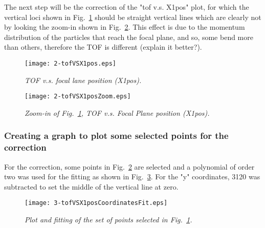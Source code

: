 \documentclass[11pt]{report}
\begin{document}
\noindent
The next step will be the correction of the "tof v.s. X1pos" plot, for which 
the vertical loci shown in Fig.~\ref{fig:tofVSX1pos} should be straight vertical lines 
which are clearly not by looking the zoom-in shown in Fig.~\ref{fig:tofVSX1posZoom}. 
This effect is due to the  momentum distribution of the particles that reach the focal plane, and so, 
some bend more than others, therefore the TOF is different ({\color{red}explain it better?}).

\begin{figure}[h]
 \begin{center}
\texttt{[image: 2-tofVSX1pos.eps]}  
 \end{center}
\vspace*{-4mm}
\caption{\label{fig:tofVSX1pos} \it  TOF v.s. focal lane position (X1pos).}
\end{figure}
\vspace*{4mm}

\begin{figure}[h]
 \begin{center}
\texttt{[image: 2-tofVSX1posZoom.eps]}  
 \end{center}
\vspace*{-4mm}
\caption{\label{fig:tofVSX1posZoom} \it Zoom-in of Fig.~\ref{fig:tofVSX1pos}, TOF v.s. Focal Plane position (X1pos).}
\end{figure}
\vspace*{4mm}


\subsubsection{Creating a graph to plot some selected points for the correction}

For the correction, some points in Fig.~\ref{fig:tofVSX1posZoom} are selected and 
a polynomial of order two was used for the fitting 
as shown in Fig.~\ref{fig:tofVSX1posCoordinatesFit}. For the "y" coordinates, 
3120 was subtracted to set the middle of the vertical line at zero.

\begin{figure}[h]
 \begin{center}
\texttt{[image: 3-tofVSX1posCoordinatesFit.eps]}  
 \end{center}
\vspace*{-4mm}
\caption{\label{fig:tofVSX1posCoordinatesFit} \it Plot and fitting of the set of points selected in Fig.~\ref{fig:tofVSX1pos}.}
\end{figure}
\vspace*{4mm}
\end{document}
